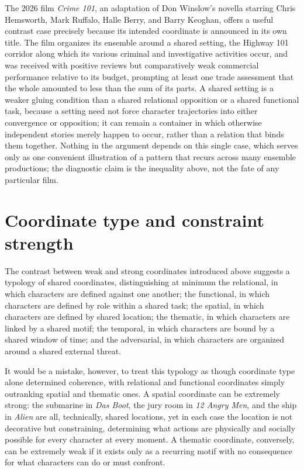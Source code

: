 \documentclass[11pt]{article}
\begin{document}
The 2026 film \emph{Crime 101}, an adaptation of Don Winslow's novella starring Chris Hemsworth, Mark Ruffalo, Halle Berry, and Barry Keoghan, offers a useful contrast case precisely because its intended coordinate is announced in its own title. The film organizes its ensemble around a shared setting, the Highway 101 corridor along which its various criminal and investigative activities occur, and was received with positive reviews but comparatively weak commercial performance relative to its budget\cite{crime101wiki}, prompting at least one trade assessment that the whole amounted to less than the sum of its parts\cite{crime101thr}. A shared setting is a weaker gluing condition than a shared relational opposition or a shared functional task, because a setting need not force character trajectories into either convergence or opposition; it can remain a container in which otherwise independent stories merely happen to occur, rather than a relation that binds them together. Nothing in the argument depends on this single case, which serves only as one convenient illustration of a pattern that recurs across many ensemble productions; the diagnostic claim is the inequality above, not the fate of any particular film.

\section{Coordinate type and constraint strength}

The contrast between weak and strong coordinates introduced above suggests a typology of shared coordinates, distinguishing at minimum the relational, in which characters are defined against one another; the functional, in which characters are defined by role within a shared task; the spatial, in which characters are defined by shared location; the thematic, in which characters are linked by a shared motif; the temporal, in which characters are bound by a shared window of time; and the adversarial, in which characters are organized around a shared external threat.

It would be a mistake, however, to treat this typology as though coordinate type alone determined coherence, with relational and functional coordinates simply outranking spatial and thematic ones. A spatial coordinate can be extremely strong: the submarine in \emph{Das Boot}, the jury room in \emph{12 Angry Men}, and the ship in \emph{Alien} are all, technically, shared locations, yet in each case the location is not decorative but constraining, determining what actions are physically and socially possible for every character at every moment. A thematic coordinate, conversely, can be extremely weak if it exists only as a recurring motif with no consequence for what characters can do or must confront.
\end{document}
